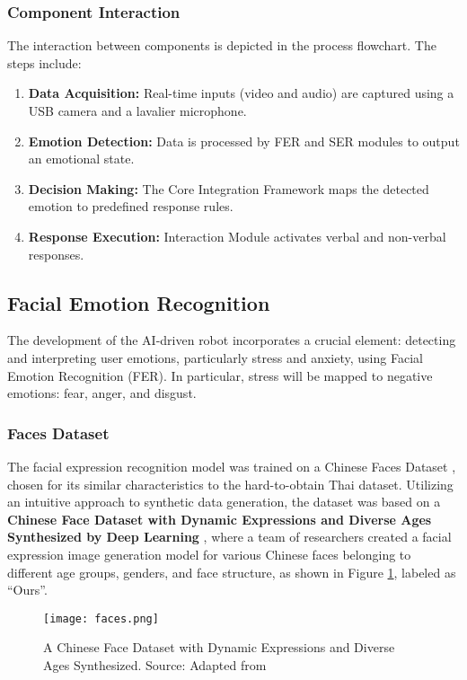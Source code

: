\subsubsection{Component Interaction}

The interaction between components is depicted in the process flowchart. The steps include:
\begin{enumerate}
    \item\textbf{Data Acquisition:} Real-time inputs (video and audio) are captured using a USB camera and a lavalier microphone.
    \item\textbf{Emotion Detection:} Data is processed by FER and SER modules to output an emotional state.
    \item\textbf{Decision Making:} The Core Integration Framework maps the detected emotion to predefined response rules.
    \item\textbf{Response Execution:} Interaction Module activates verbal and non-verbal responses.
\end{enumerate}

\subsection{Facial Emotion Recognition}
The development of the AI-driven robot incorporates a crucial element: detecting and interpreting user emotions, particularly stress and anxiety, using Facial Emotion Recognition (FER). In particular, stress will be mapped to negative emotions: fear, anger, and disgust.

\subsubsection{Faces Dataset}
The facial expression recognition model was trained on a Chinese Faces Dataset , chosen for its similar characteristics to the hard-to-obtain Thai dataset. Utilizing an intuitive approach to synthetic data generation, the dataset was based on a  \textbf{Chinese Face Dataset with Dynamic Expressions and Diverse Ages Synthesized by Deep Learning} \cite{han-2023}, where a team of researchers created a facial expression image generation model for various Chinese faces belonging to different age groups, genders, and face structure, as shown in Figure \ref{fig:face}, labeled as “Ours”.

\begin{figure}[!ht]
    \centering
    \captionsetup{justification=centering}
    \texttt{[image: faces.png]}
    \caption{ A Chinese Face Dataset with Dynamic Expressions and Diverse Ages Synthesized. Source: Adapted from \cite{han-2023}}
    \label{fig:face}
\end{figure}


